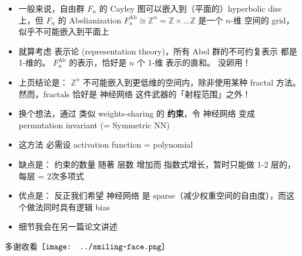 \documentclass[15pt]{beamer}
\newcommand{\cc}[2]{#1}
\newcommand{\cc}[2]{#2}
\newcommand{\emp}[1]{{\color{violet}#1}}
\newcommand{\red}[1]{{\color{red}#1}}
\renewcommand{\smiley}{$\vcenter{\hbox{\texttt{[image: ../smiling-face.png]}}}$}
\begin{document}
\begin{frame}
\begin{itemize}
\begin{equation}
		\end{equation}
		
	\item \cc{
	一般来说，自由群 $F_n$ 的 Cayley 图可以嵌入到（平面的）hyperbolic disc 上，但 $F_n$ 的 Abelianization $F_n^{\text{Ab}} \cong \mathbb{Z}^n = \mathbb{Z} \times ... \mathbb{Z}$ 是一个 \red{$n$-维} 空间的 grid，似乎不可能嵌入到平面上}{
	Generally, the free group $F_n$'s Cayley graph can be embedded into the (planar) hyperbolic disc, but the Abelianization of $F_n = F_n^{\text{Ab}} \cong \mathbb{Z}^n = \mathbb{Z} \times ... \mathbb{Z}$ is a \red{$n$-dimensional} grid, which seems impossible to embed on a plane.
	}
	\item \cc{
	就算考虑 表示论 (representation theory)，所有 Abel 群的不可约复表示 都是 1-维的。 $F_n^{\text{Ab}}$ 的表示，恰好是 $n$ 个 1-维 表示的直和。 没卵用！}{
	Even considering representation theory, all irreducible representations of Abelian groups are 1-dimensional.  The representation of $F_n^{\text{Ab}}$ is precisely the direct sum of $n$ copies of dim-1 representations.  Useless!
	}
	
\end{itemize}
\end{frame}

\begin{frame}[plain]
\begin{itemize}
	\item \cc{
	上页结论是： $\mathbb{Z}^n$ 不可能嵌入到更低维的空间内，除非使用某种 \red{fractal} 方法。  然而，fractals 恰好是 神经网络 这件武器的「射程范围」之外！ }{
	We conclude from above that $\mathbb{Z}^n$ cannot be embedded into lower dimensions, unless we use some kind of \emp{fractal} structure.  However, fractals are exactly the realm that is out-of-reach of the universal approximating power of neural networks!
	}
	
	\item \cc{
	换个想法，通过 类似 weights-sharing 的 \textbf{约束}，令 神经网络 变成 permutation invariant (= \red{Symmetric NN})}{
	
	}
	
	
	\item 这方法 必需设 activation function = polynomial
	
	\item 缺点是： 约束的数量 随著 层数 增加而 指数式增长，暂时只能做 1-2 层的，每层 = 2次多项式
	
	\item 优点是： 反正我们希望 神经网络 是 sparse（减少权重空间的自由度），而这个做法同时具有逻辑 bias
	
	\item 细节我会在另一篇论文讲述
\end{itemize}
\printbibliography
\begin{center}
	多谢收看 \smiley
\end{center}
\end{frame}
\end{document}
